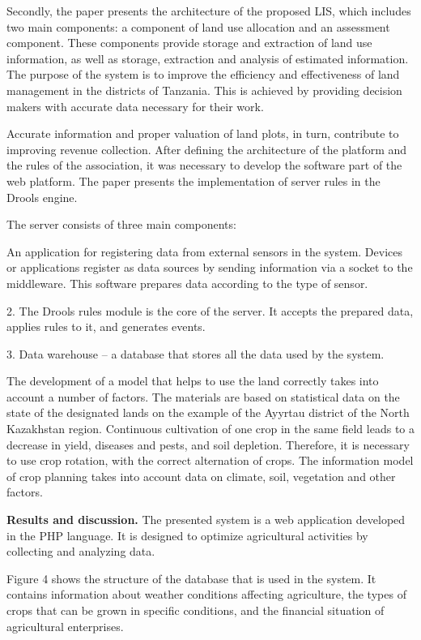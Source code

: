 Secondly, the paper presents the architecture of the proposed LIS, which
includes two main components: a component of land use allocation and an
assessment component. These components provide storage and extraction of
land use information, as well as storage, extraction and analysis of
estimated information. The purpose of the system is to improve the
efficiency and effectiveness of land management in the districts of
Tanzania. This is achieved by providing decision makers with accurate
data necessary for their work.

Accurate information and proper valuation of land plots, in turn,
contribute to improving revenue collection. After defining the
architecture of the platform and the rules of the association, it was
necessary to develop the software part of the web platform. The paper
presents the implementation of server rules in the Drools engine.

The server consists of three main components:

An application for registering data from external sensors in the system.
Devices or applications register as data sources by sending information
via a socket to the middleware. This software prepares data according to
the type of sensor.

2. The Drools rules module is the core of the server. It accepts the
prepared data, applies rules to it, and generates events.

3. Data warehouse -- a database that stores all the data used by the
system.

The development of a model that helps to use the land correctly takes
into account a number of factors. The materials are based on statistical
data on the state of the designated lands on the example of the Ayyrtau
district of the North Kazakhstan region. Continuous cultivation of one
crop in the same field leads to a decrease in yield, diseases and pests,
and soil depletion. Therefore, it is necessary to use crop rotation,
with the correct alternation of crops. The information model of crop
planning takes into account data on climate, soil, vegetation and other
factors.

\textbf{Results and discussion.} The presented system is a web
application developed in the PHP language. It is designed to optimize
agricultural activities by collecting and analyzing data.

Figure 4 shows the structure of the database that is used in the system.
It contains information about weather conditions affecting agriculture,
the types of crops that can be grown in specific conditions, and the
financial situation of agricultural enterprises.

